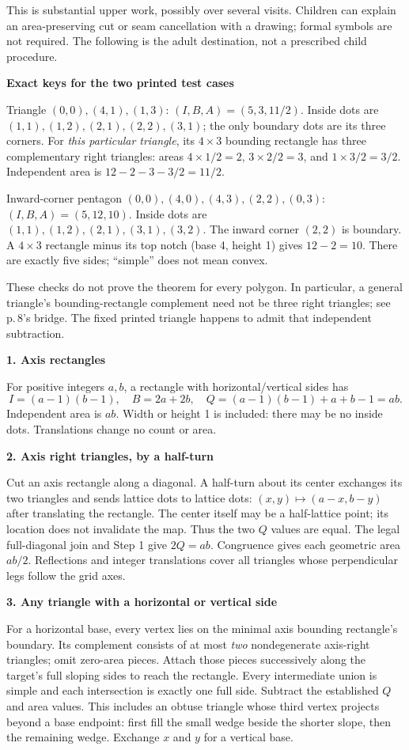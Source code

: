 \documentclass[letterpaper,11pt]{article}
\newcommand{\heading}[1]{\vspace{3pt}{\large\bfseries #1}\par}
\newcommand{\subhead}[1]{\vspace{2pt}\textbf{#1}\par}
\newcommand{\rec}[3]{\ensuremath{(I,B,A)=(#1,#2,#3)}}
\begin{document}
\heading{Problem 8 / student p.\,8 / full proof, first part}
This is substantial upper work, possibly over several visits. Children can explain an area-preserving cut or seam cancellation with a drawing; formal symbols are not required. The following is the adult destination, not a prescribed child procedure.

\subhead{Exact keys for the two printed test cases}
Triangle $(0,0),\allowbreak(4,1),\allowbreak(1,3)$: \rec{5}{3}{11/2}. Inside dots are $(1,1),\allowbreak(1,2),\allowbreak(2,1),\allowbreak(2,2),\allowbreak(3,1)$; the only boundary dots are its three corners. For \emph{this particular triangle}, its $4\times3$ bounding rectangle has three complementary right triangles: areas $4\times1/2=2$, $3\times2/2=3$, and $1\times3/2=3/2$. Independent area is $12-2-3-3/2=11/2$.

Inward-corner pentagon $(0,0),\allowbreak(4,0),\allowbreak(4,3),\allowbreak(2,2),\allowbreak(0,3)$: \rec{5}{12}{10}. Inside dots are $(1,1),\allowbreak(1,2),\allowbreak(2,1),\allowbreak(3,1),\allowbreak(3,2)$. The inward corner $(2,2)$ is boundary. A $4\times3$ rectangle minus its top notch (base 4, height 1) gives $12-2=10$. There are exactly five sides; ``simple'' does not mean convex.

These checks do not prove the theorem for every polygon. In particular, a general triangle's bounding-rectangle complement need not be three right triangles; see p.\,8's bridge. The fixed printed triangle happens to admit that independent subtraction.

\subhead{1. Axis rectangles}
For positive integers $a,b$, a rectangle with horizontal/vertical sides has
\[I=(a-1)(b-1),\quad B=2a+2b,\quad Q=(a-1)(b-1)+a+b-1=ab.\]
Independent area is $ab$. Width or height 1 is included: there may be no inside dots. Translations change no count or area.

\subhead{2. Axis right triangles, by a half-turn}
Cut an axis rectangle along a diagonal. A half-turn about its center exchanges its two triangles and sends lattice dots to lattice dots: $(x,y)\mapsto(a-x,b-y)$ after translating the rectangle. The center itself may be a half-lattice point; its location does not invalidate the map. Thus the two $Q$ values are equal. The legal full-diagonal join and Step 1 give $2Q=ab$. Congruence gives each geometric area $ab/2$. Reflections and integer translations cover all triangles whose perpendicular legs follow the grid axes.

\subhead{3. Any triangle with a horizontal or vertical side}
For a horizontal base, every vertex lies on the minimal axis bounding rectangle's boundary. Its complement consists of at most \emph{two} nondegenerate axis-right triangles; omit zero-area pieces. Attach those pieces successively along the target's full sloping sides to reach the rectangle. Every intermediate union is simple and each intersection is exactly one full side. Subtract the established $Q$ and area values. This includes an obtuse triangle whose third vertex projects beyond a base endpoint: first fill the small wedge beside the shorter slope, then the remaining wedge. Exchange $x$ and $y$ for a vertical base.
\end{document}
